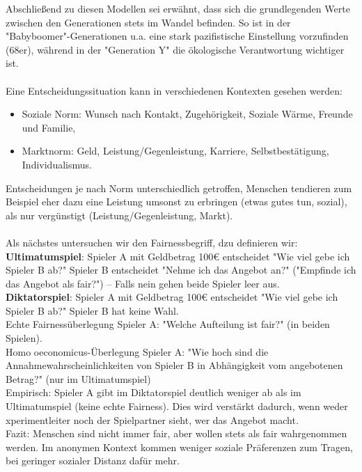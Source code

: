 Abschließend zu diesen Modellen sei erwähnt, dass sich die grundlegenden Werte zwischen den Generationen stets im Wandel befinden. So ist in der "Babyboomer"-Generationen u.a. eine stark pazifistische Einstellung vorzufinden (68er), während in der "Generation Y" die ökologische Verantwortung wichtiger ist.\\
\ \\
Eine Entscheidungssituation kann in verschiedenen Kontexten gesehen werden:
\begin{itemize}
	\item Soziale Norm: Wunsch nach Kontakt, Zugehörigkeit, Soziale Wärme, Freunde und Familie,
	\item Marktnorm: Geld, Leistung/Gegenleistung, Karriere, Selbstbestätigung, Individualismus.
\end{itemize}
Entscheidungen je nach Norm unterschiedlich getroffen, Menschen tendieren zum Beispiel eher dazu eine Leistung umsonst zu erbringen (etwas gutes tun, sozial), als nur vergünstigt (Leistung/Gegenleistung, Markt).\\
\ \\
Als nächstes untersuchen wir den Fairnessbegriff, dzu definieren wir:\\
\textbf{Ultimatumspiel}: Spieler A mit Geldbetrag 100€ entscheidet "Wie viel gebe ich Spieler B ab?" Spieler B entscheidet "Nehme ich das Angebot an?" ("Empfinde ich das Angebot als fair?") -- Falls nein gehen beide Spieler leer aus.\\
\textbf{Diktatorspiel}: Spieler A mit Geldbetrag 100€ entscheidet "Wie viel gebe ich Spieler B ab?" Spieler B hat keine Wahl.\\
Echte Fairnessüberlegung Spieler A: "Welche Aufteilung ist fair?" (in beiden Spielen).\\
Homo oeconomicus-Überlegung Spieler A: "Wie hoch sind die Annahmewahrscheinlichkeiten von Spieler B in Abhängigkeit vom angebotenen Betrag?" (nur im Ultimatumspiel)\\
Empirisch: Spieler A gibt im Diktatorspiel deutlich weniger ab als im Ultimatumspiel (keine echte Fairness). Dies wird verstärkt dadurch, wenn weder xperimentleiter noch der Spielpartner sieht, wer das Angebot macht.\\
Fazit: Menschen sind nicht immer fair, aber wollen stets als fair wahrgenommen werden. Im anonymen Kontext kommen weniger soziale Präferenzen zum Tragen, bei geringer sozialer Distanz dafür mehr.

